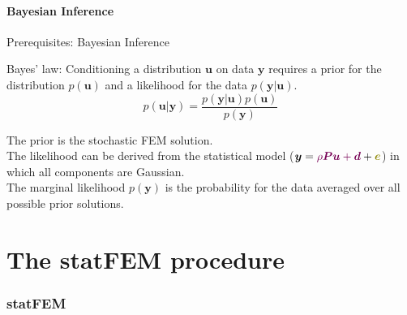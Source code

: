 \documentclass[fleqn,11pt,aspectratio=43]{beamer}
\begin{document}



\subsection{Bayesian Inference}
\begin{frame}{Prerequisites: Bayesian Inference}
\begin{block}{Bayes' law:}
Conditioning a distribution $\bm{u}$ on data $\bm{y}$ requires a prior for the distribution $p(\bm{u})$ and a likelihood for the data $p(\bm{y}|\bm{u})$.
\begin{equation*}
p(\bm{u}|\bm{y}) = \frac{p(\bm{y}|\bm{u})p(\bm{u})}{p(\bm{y})}
\end{equation*}
\end{block}
The prior is the stochastic FEM solution.\\
The likelihood can be derived from the statistical model ($\bm{y} = \textcolor{DGTU}{\rho \bm{P} \bm{u} + \bm{d}} + \textcolor{olive}{\bm{e}}$) in which all components are Gaussian.\\
The marginal likelihood $p(\bm{y})$ is the probability for the data averaged over all possible prior solutions.
\end{frame}











\part{The statFEM procedure}
\begin{frame}[plain]
  \partpage
\end{frame}


\section{statFEM}
\end{document}
